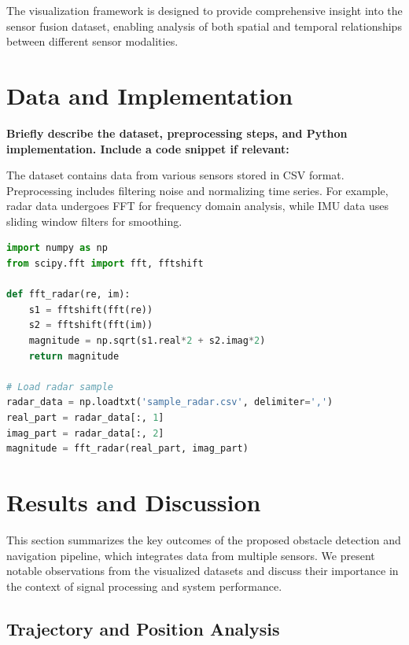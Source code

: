 \documentclass[12pt,a4paper]{article}
\begin{document}
The visualization framework is designed to provide comprehensive insight into the sensor fusion dataset, enabling analysis of both spatial and temporal relationships between different sensor modalities.
\section{Data and Implementation}
\textbf{Briefly describe the dataset, preprocessing steps, and Python implementation. Include a code snippet if relevant:}

The dataset contains data from various sensors stored in CSV format. Preprocessing includes filtering noise and normalizing time series. For example, radar data undergoes FFT for frequency domain analysis, while IMU data uses sliding window filters for smoothing.

\begin{lstlisting}[language=Python, caption=Radar Data undergoes FFT]
import numpy as np
from scipy.fft import fft, fftshift

def fft_radar(re, im):
    s1 = fftshift(fft(re))
    s2 = fftshift(fft(im))
    magnitude = np.sqrt(s1.real*2 + s2.imag*2)
    return magnitude

# Load radar sample
radar_data = np.loadtxt('sample_radar.csv', delimiter=',')
real_part = radar_data[:, 1]
imag_part = radar_data[:, 2]
magnitude = fft_radar(real_part, imag_part)

\end{lstlisting}
\section{Results and Discussion}

This section summarizes the key outcomes of the proposed obstacle detection and navigation pipeline, which integrates data from multiple sensors. We present notable observations from the visualized datasets and discuss their importance in the context of signal processing and system performance.

\subsection{Trajectory and Position Analysis}
\end{document}
